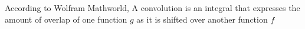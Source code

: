 \documentclass[preview]{standalone}
\begin{document}
\begin{center}
According to Wolfram Mathworld,
A convolution is an integral that expresses the amount of overlap
of one function \(g\) as it is shifted over another function \(f\)
\end{center}
\end{document}
